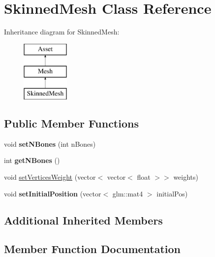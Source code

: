 \hypertarget{class_skinned_mesh}{}\section{Skinned\+Mesh Class Reference}
\label{class_skinned_mesh}
Inheritance diagram for Skinned\+Mesh\+:\begin{figure}[H]
\begin{center}
\leavevmode
\includegraphics[height=3.000000cm]{class_skinned_mesh}
\end{center}
\end{figure}
\subsection*{Public Member Functions}
\begin{DoxyCompactItemize}
\item 
\hypertarget{class_skinned_mesh_a612bb08a70f98fc4be45615592dadf5c}{}void {\bfseries set\+N\+Bones} (int n\+Bones)\label{class_skinned_mesh_a612bb08a70f98fc4be45615592dadf5c}

\item 
\hypertarget{class_skinned_mesh_ab8f404e4843d76e02387517ec7cc3cee}{}int {\bfseries get\+N\+Bones} ()\label{class_skinned_mesh_ab8f404e4843d76e02387517ec7cc3cee}

\item 
void \hyperlink{class_skinned_mesh_a185a679f88fdf60177196b3f1f591e4f}{set\+Vertices\+Weight} (vector$<$ vector$<$ float $>$$>$ weights)
\item 
\hypertarget{class_skinned_mesh_a70912234b58d31ab8aee540d3fb288a8}{}void {\bfseries set\+Initial\+Position} (vector$<$ glm\+::mat4 $>$ initial\+Pos)\label{class_skinned_mesh_a70912234b58d31ab8aee540d3fb288a8}

\end{DoxyCompactItemize}
\subsection*{Additional Inherited Members}


\subsection{Member Function Documentation}
\hypertarget{class_skinned_mesh_a185a679f88fdf60177196b3f1f591e4f}{}
